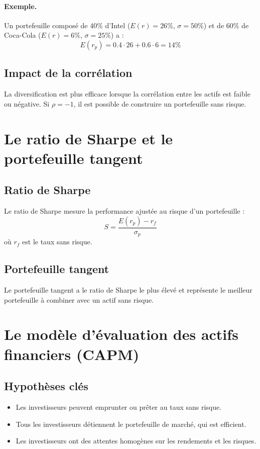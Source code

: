 \documentclass[a4paper, 12pt]{report}
\begin{document}
\paragraph{Exemple.} 
Un portefeuille composé de 40\% d’Intel ($E(r) = 26\%$, $\sigma = 50\%$) et de 60\% de Coca-Cola ($E(r) = 6\%$, $\sigma = 25\%$) a :
\[
E(r_p) = 0.4 \cdot 26 + 0.6 \cdot 6 = 14\%
\]

\subsection{Impact de la corrélation}
La diversification est plus efficace lorsque la corrélation entre les actifs est faible ou négative. Si $\rho = -1$, il est possible de construire un portefeuille sans risque.

\section{Le ratio de Sharpe et le portefeuille tangent}

\subsection{Ratio de Sharpe}
Le ratio de Sharpe mesure la performance ajustée au risque d’un portefeuille :
\[
S = \frac{E(r_p) - r_f}{\sigma_p}
\]
où $r_f$ est le taux sans risque.

\subsection{Portefeuille tangent}
Le portefeuille tangent a le ratio de Sharpe le plus élevé et représente le meilleur portefeuille à combiner avec un actif sans risque.

\section{Le modèle d’évaluation des actifs financiers (CAPM)}

\subsection{Hypothèses clés}
\begin{itemize}
	\item Les investisseurs peuvent emprunter ou prêter au taux sans risque.
	\item Tous les investisseurs détiennent le portefeuille de marché, qui est efficient.
	\item Les investisseurs ont des attentes homogènes sur les rendements et les risques.
\end{itemize}
\end{document}
